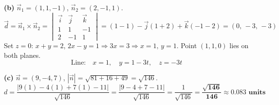 \documentclass[addpoints]{exam}
\begin{document}
\begin{questions}
\begin{solution}[10cm]
\textbf{(b)} $\vec{n}_1=(1,1,-1)$, $\vec{n}_2=(2,-1,1)$.
\[
\vec{d} = \vec{n}_1\times\vec{n}_2 =
\begin{vmatrix}\vec{i}&\vec{j}&\vec{k}\\1&1&-1\\2&-1&1\end{vmatrix}
= (1-1)-\vec{j}(1+2)+\vec{k}(-1-2) = (0,\,-3,\,-3)
\]
Set $z=0$: $x+y=2$, $2x-y=1 \Rightarrow 3x=3 \Rightarrow x=1,\,y=1$.
Point $(1,1,0)$ lies on both planes.
\[
\text{Line:}\quad x=1,\quad y=1-3t,\quad z=-3t
\]

\textbf{(c)} $\vec{n} = (9,-4,7)$, $|\vec{n}|=\sqrt{81+16+49}=\sqrt{146}$.
\[
d = \frac{|9(1)-4(1)+7(1)-11|}{\sqrt{146}} = \frac{|9-4+7-11|}{\sqrt{146}}
= \frac{1}{\sqrt{146}} = \mathbf{\frac{\sqrt{146}}{146} \approx 0.083 \text{ units}}
\]
\end{solution}

\end{questions}
\end{document}
